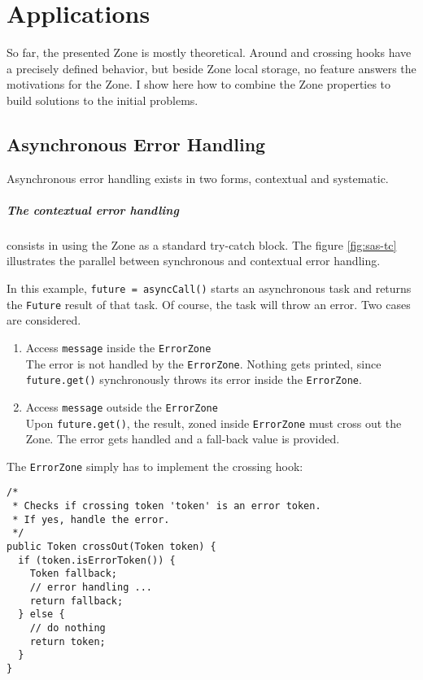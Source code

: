 
\chapter{Applications}
\label{ch:apps}


So far, the presented Zone is mostly theoretical. Around and crossing hooks have a precisely defined behavior, but beside Zone local storage, no feature answers the motivations for the Zone. I show here how to combine the Zone properties to build solutions to the initial problems.

\section{Asynchronous Error Handling}

Asynchronous error handling exists in two forms, contextual and systematic.

\paragraph{The contextual error handling} consists in using the Zone as a standard try-catch block. The figure \ref{fig:sas-tc} illustrates the parallel between synchronous and contextual error handling.

In this example, \lstinline{future = asyncCall()} starts an asynchronous task and returns the \lstinline{Future} result of that task. Of course, the task will throw an error. Two cases are considered.

\begin{enumerate}
\item Access \lstinline{message} inside the \lstinline{ErrorZone}\\
The error is not handled by the \lstinline{ErrorZone}. Nothing gets printed, since \lstinline{future.get()} synchronously throws its error inside the \lstinline{ErrorZone}.
\item Access \lstinline{message} outside the \lstinline{ErrorZone}\\
Upon \lstinline{future.get()}, the result, zoned inside \lstinline{ErrorZone} must cross out the Zone. The error gets handled and a fall-back value is provided.
\end{enumerate}

The \lstinline{ErrorZone} simply has to implement the crossing hook:

\begin{lstlisting}
/*
 * Checks if crossing token 'token' is an error token.
 * If yes, handle the error.
 */
public Token crossOut(Token token) {
  if (token.isErrorToken()) {
    Token fallback;
    // error handling ...
    return fallback;
  } else {
    // do nothing
    return token;
  }
}
\end{lstlisting}

